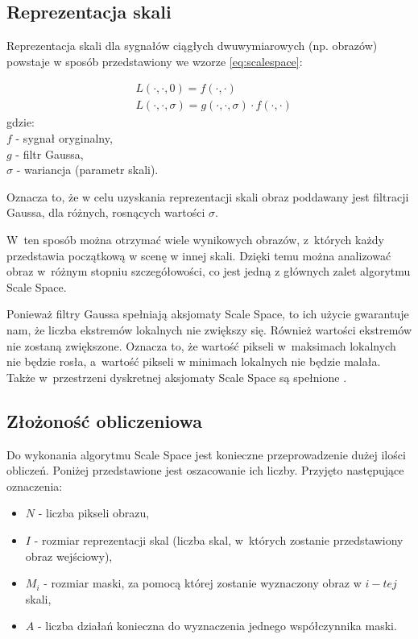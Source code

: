 \subsection{Reprezentacja skali}
\label{subsec:reprezentacjaskali}
Reprezentacja skali dla sygnałów ciągłych dwuwymiarowych (np. obrazów) powstaje w sposób przedstawiony we wzorze \ref{eq:scalespace}:

\begin{equation}
\label{eq:scalespace}
\begin{split}
& L(\cdot,\cdot,0) = f(\cdot,\cdot) \\
& L(\cdot,\cdot,\sigma) = g(\cdot,\cdot,\sigma)\cdot f(\cdot,\cdot)
\end{split}
\end{equation}
gdzie:\\
$ f $ - sygnał oryginalny, \\
$ g $ - filtr Gaussa, \\
$ \sigma $ - wariancja (parametr skali).

Oznacza to, że w celu uzyskania reprezentacji skali obraz poddawany jest filtracji Gaussa, dla różnych, rosnących wartości $ \sigma $.

W~ten sposób można otrzymać wiele wynikowych obrazów, z~których każdy przedstawia początkową w scenę w innej skali. Dzięki temu można analizować obraz w~różnym stopniu szczegółowości, co jest jedną z głównych zalet algorytmu Scale Space.

Ponieważ filtry Gaussa spełniają aksjomaty Scale Space, to ich użycie gwarantuje nam, że liczba ekstremów lokalnych nie zwiększy się. Również wartości ekstremów nie zostaną zwiększone. Oznacza to, że wartość pikseli w~maksimach lokalnych nie będzie rosła, a~wartość pikseli w minimach lokalnych nie będzie malała. Także w~przestrzeni dyskretnej aksjomaty Scale Space są spełnione \cite{SSFDS}.


\subsection{Złożoność obliczeniowa}
\label{subsec:zlozonosc_obliczeniowa}

Do wykonania algorytmu Scale Space jest konieczne przeprowadzenie dużej ilości obliczeń. Poniżej przedstawione jest oszacowanie ich liczby. Przyjęto następujące oznaczenia:
\begin{itemize}
\item $ N $ - liczba pikseli obrazu,
\item $ I $ - rozmiar reprezentacji skal (liczba skal, w~których zostanie przedstawiony obraz wejściowy),
\item $ M_i $ - rozmiar maski, za pomocą której zostanie wyznaczony obraz w $ i-tej $ skali,
\item $ A $ - liczba działań konieczna do wyznaczenia jednego współczynnika maski.
\end{itemize}

